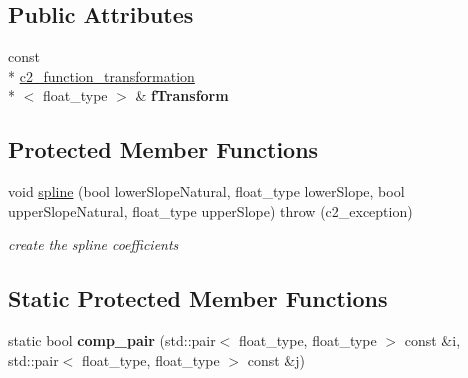 \subsection*{Public Attributes}
\begin{DoxyCompactItemize}
\item 
\hypertarget{classinterpolating__function__p_a51af1a7077b6f904abe2ede816972eb7}{const \\*
\hyperlink{classc2__function__transformation}{c2\-\_\-function\-\_\-transformation}\\*
$<$ float\-\_\-type $>$ \& {\bfseries f\-Transform}}\label{classinterpolating__function__p_a51af1a7077b6f904abe2ede816972eb7}

\end{DoxyCompactItemize}
\subsection*{Protected Member Functions}
\begin{DoxyCompactItemize}
\item 
\hypertarget{classinterpolating__function__p_aa2cfb88d95864c68d5be6e4812f8ec51}{void \hyperlink{classinterpolating__function__p_aa2cfb88d95864c68d5be6e4812f8ec51}{spline} (bool lower\-Slope\-Natural, float\-\_\-type lower\-Slope, bool upper\-Slope\-Natural, float\-\_\-type upper\-Slope)  throw (c2\-\_\-exception)}\label{classinterpolating__function__p_aa2cfb88d95864c68d5be6e4812f8ec51}

\begin{DoxyCompactList}\small\item\em create the spline coefficients \end{DoxyCompactList}\end{DoxyCompactItemize}
\subsection*{Static Protected Member Functions}
\begin{DoxyCompactItemize}
\item 
\hypertarget{classinterpolating__function__p_a06bbf33a20dac7faa95458cf384e33a2}{static bool {\bfseries comp\-\_\-pair} (std\-::pair$<$ float\-\_\-type, float\-\_\-type $>$ const \&i, std\-::pair$<$ float\-\_\-type, float\-\_\-type $>$ const \&j)}\label{classinterpolating__function__p_a06bbf33a20dac7faa95458cf384e33a2}

\end{DoxyCompactItemize}
